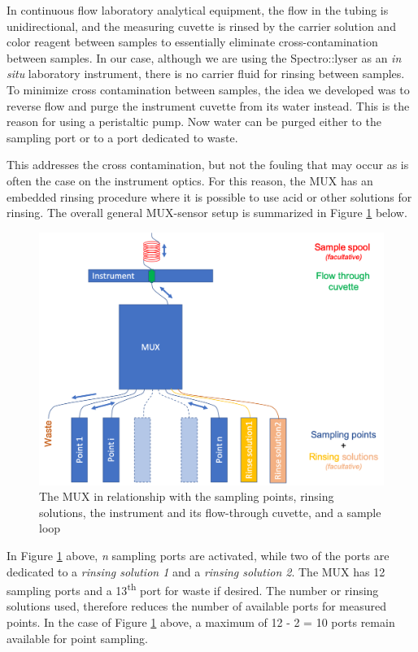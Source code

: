 \documentclass[]{book}
\begin{document}
In continuous flow laboratory analytical equipment, the flow in the tubing is unidirectional, and the measuring cuvette is rinsed by the carrier solution and color reagent between samples to essentially eliminate cross-contamination between samples. In our case, although we are using the Spectro::lyser as an \emph{in situ} laboratory instrument, there is no carrier fluid for rinsing between samples. To minimize cross contamination between samples, the idea we developed was to reverse flow and purge the instrument cuvette from its water instead. This is the reason for using a peristaltic pump. Now water can be purged either to the sampling port or to a port dedicated to waste.

This addresses the cross contamination, but not the fouling that may occur as is often the case on the instrument optics. For this reason, the MUX has an embedded rinsing procedure where it is possible to use acid or other solutions for rinsing. The overall general MUX-sensor setup is summarized in Figure \ref{fig:WorkLayout} below.

\begin{figure}

{\centering \includegraphics[width=0.8\linewidth]{pictures/WorkLayout} 

}

\caption{The MUX in relationship with the sampling points, rinsing solutions, the instrument and its flow-through cuvette, and a sample loop}\label{fig:WorkLayout}
\end{figure}

In Figure \ref{fig:WorkLayout} above, \emph{n} sampling ports are activated, while two of the ports are dedicated to a \emph{rinsing solution 1} and a \emph{rinsing solution 2}. The MUX has 12 sampling ports and a 13\textsuperscript{th} port for waste if desired. The number or rinsing solutions used, therefore reduces the number of available ports for measured points. In the case of Figure \ref{fig:WorkLayout} above, a maximum of 12 - 2 = 10 ports remain available for point sampling.
\end{document}
